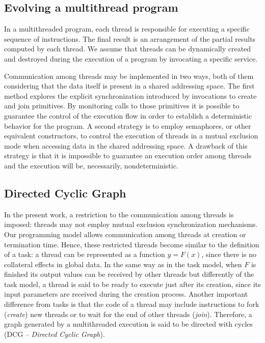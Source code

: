 \documentclass[twocolumn]{svjour3}
\begin{document}
\subsection{Evolving a multithread program}

In a multithreaded program, each thread is responsible for executing a specific sequence of instructions. The final result is an arrangement of the partial results computed by each thread. We assume that threads can be dynamically created and destroyed during the execution of a program by invocating a specific service.

Communication among threads may be implemented in two ways, both of them considering that the data itself is present in a shared addressing space. The first method explores the explicit synchronization introduced by invocations to create and join primitives. By monitoring calls to those primitives it is possible to guarantee the control of the execution flow in order to establish a deterministic behavior for the program. 
A second strategy is to employ semaphores, or other equivalent constructors, to control the execution of threads in a mutual exclusion mode when accessing data in the shared addressing space. A drawback of this strategy is that it is impossible to guarantee an execution order among threads and the execution will be, necessarily, nondeterministic.

\subsection{Directed Cyclic Graph}

In the present work, a restriction to the communication among threads is imposed: threads may not employ mutual exclusion synchronization mechanisms. Our programming model allows communication among threads at creation or termination time.
Hence, these restricted threads become similar to the definition of a task: a thread can be represented as a function $y = F(x)$, since there is no collateral effects in global data. In the same way as in the task model, when $F$ is finished its output values can be received by other threads but differently of the task model, a thread is said to be ready to execute just after its creation, since its input parameters are received during the creation process. Another important difference from tasks is that the code of a thread may include instructions to fork (\emph{create}) new threads or to wait for the end of other threads (\emph{join}). Therefore, a graph generated by a multithreaded execution is said to be directed with cycles (DCG – {\em Directed Cyclic Graph}).
\end{document}
